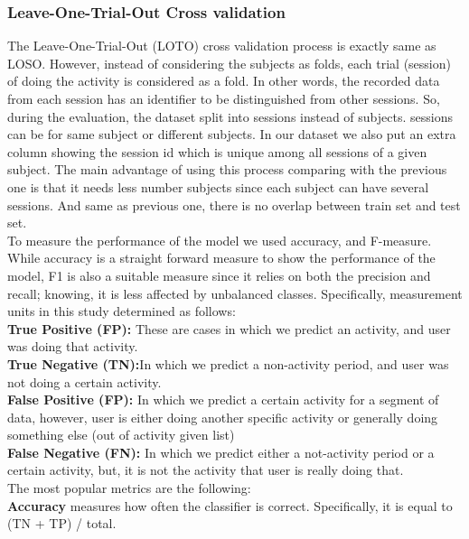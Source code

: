 \documentclass[journal,article,submit,moreauthors,pdftex]{Definitions/mdpi}
\begin{document}
\subsubsection{Leave-One-Trial-Out Cross validation}
The Leave-One-Trial-Out (LOTO) cross validation process is exactly same as LOSO. However, instead of considering the subjects as folds, each trial (session) of doing the activity is considered as a fold. In other words, the recorded data from each session has an identifier to be distinguished from other sessions. So, during the evaluation, the dataset split into sessions instead of subjects. sessions can be for same subject or different subjects. In our dataset we also put an extra column showing the session id which is unique among all sessions of a given subject. The main advantage of using this process comparing with the previous one is that it needs less number subjects since each subject can have several sessions. And same as previous one, there is no overlap between train set and test set.\\
To measure the performance of the model we used accuracy\cite{brownlee2018gentle}\cite{zhang2011feature},\cite{mehrang2017human} and F-measure\cite{rosati2018comparison}\cite{Nourani_CoMoRea2019}. While accuracy is a straight forward measure to show the performance of the model, F1 is also a suitable measure since it relies on both the precision and recall; knowing, it is less affected by unbalanced classes.
Specifically, measurement units in this study determined as follows:\\
\textbf{True Positive (FP):} These are cases in which we predict an activity, and user was doing that activity.\\
\textbf{True Negative (TN):}In which we predict a non-activity period, and user was not doing a certain activity.\\
\textbf{False Positive (FP):} In which we predict a certain activity for a segment of data, however, user is either doing another specific activity or generally doing something else (out of activity given list)\\
\textbf{False Negative (FN):} In which we predict either a not-activity period or a certain activity, but, it is not the activity that user is really doing that.\\
The most popular metrics are the following:\\
\noindent \textbf{Accuracy} measures how often the classifier is correct. Specifically, it is equal to (TN + TP) / total.\\
\end{document}
